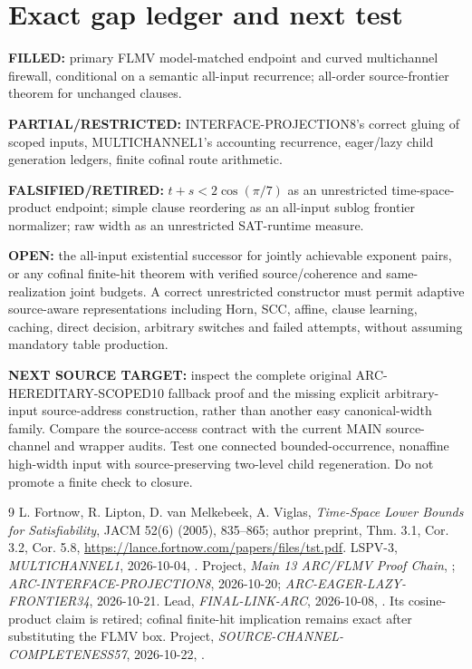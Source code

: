 \documentclass[11pt]{article}
\begin{document}
\section{Exact gap ledger and next test}
\noindent\textbf{FILLED:} primary FLMV model-matched endpoint and curved multichannel firewall, conditional on a semantic all-input recurrence; all-order source-frontier theorem for unchanged clauses.
\par\noindent\textbf{PARTIAL/RESTRICTED:} INTERFACE-PROJECTION8's correct gluing of scoped inputs, MULTICHANNEL1's accounting recurrence, eager/lazy child generation ledgers, finite cofinal route arithmetic.
\par\noindent\textbf{FALSIFIED/RETIRED:} \(t+s<2\cos(\pi/7)\) as an unrestricted time-space-product endpoint; simple clause reordering as an all-input sublog frontier normalizer; raw width as an unrestricted SAT-runtime measure.
\par\noindent\textbf{OPEN:} the all-input existential successor for jointly achievable exponent pairs, or any cofinal finite-hit theorem with verified source/coherence and same-realization joint budgets. A correct unrestricted constructor must permit adaptive source-aware representations including Horn, SCC, affine, clause learning, caching, direct decision, arbitrary switches and failed attempts, without assuming mandatory table production.
\par\noindent\textbf{NEXT SOURCE TARGET:} inspect the complete original ARC-HEREDITARY-SCOPED10 fallback proof and the missing explicit arbitrary-input source-address construction, rather than another easy canonical-width family. Compare the source-access contract with the current MAIN source-channel and wrapper audits. Test one connected bounded-occurrence, nonaffine high-width input with source-preserving two-level child regeneration. Do not promote a finite check to closure.

\begin{thebibliography}{9}
 L. Fortnow, R. Lipton, D. van Melkebeek, A. Viglas, \emph{Time-Space Lower Bounds for Satisfiability}, JACM 52(6) (2005), 835--865; author preprint, Thm. 3.1, Cor. 3.2, Cor. 5.8, \url{https://lance.fortnow.com/papers/files/tst.pdf}.
 LSPV-3, \emph{MULTICHANNEL1}, 2026-10-04, .
 Project, \emph{Main 13 ARC/FLMV Proof Chain}, ; \emph{ARC-INTERFACE-PROJECTION8}, 2026-10-20; \emph{ARC-EAGER-LAZY-FRONTIER34}, 2026-10-21.
 Lead, \emph{FINAL-LINK-ARC}, 2026-10-08, . Its cosine-product claim is retired; cofinal finite-hit implication remains exact after substituting the FLMV box.
 Project, \emph{SOURCE-CHANNEL-COMPLETENESS57}, 2026-10-22, .
\end{thebibliography}
\end{document}
